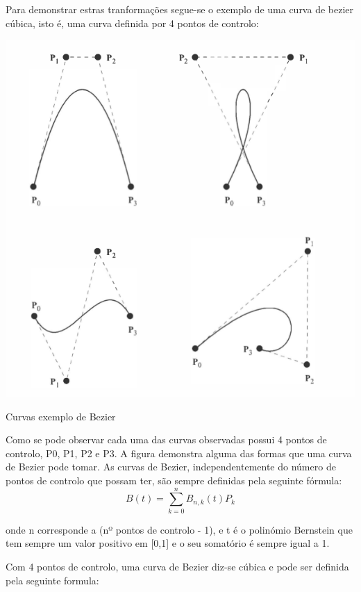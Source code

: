 Para demonstrar estras tranformações segue-se o exemplo de uma curva de bezier cúbica, isto é, uma curva definida por 4 pontos de controlo:

\begin{center}
 	
 	\includegraphics[width=\textwidth,height=\textheight,keepaspectratio]{resources/exemplos1Bezier.png}
 	\captionsetup{type=figure, width=0.8\linewidth}
	\caption{Curvas exemplo de Bezier}
\label{fig:ssec1:diagram:plane:to:sphere} 
\end{center}

Como se pode observar cada uma das curvas observadas possui 4 pontos de controlo, P0, P1, P2 e P3. A figura demonstra alguma das formas que uma curva de Bezier pode tomar. 
As curvas de Bezier, independentemente do número de pontos de controlo que possam ter, são sempre definidas pela seguinte fórmula:
\begin{equation}
B(t)=\sum_{k=0}^{n}B_{n,k}(t)P_{k}
\end{equation}

onde n corresponde a (nº pontos de controlo - 1), e t é o polinómio Bernstein que tem sempre um valor positivo em [0,1] e o seu somatório é sempre igual a 1.




Com 4 pontos de controlo, uma curva de Bezier diz-se cúbica e pode ser definida pela seguinte formula:




